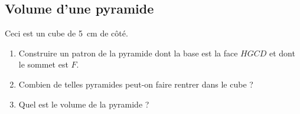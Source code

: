 
\subsection*{Volume d'une pyramide}

Ceci est un cube de \SI{5}{\centi\meter} de côté.
\begin{center}

\end{center}
\begin{enumerate}
    \item
        Construire un patron de la pyramide dont la base est la face \( HGCD\) et dont le sommet est \( F\).
    \item
        Combien de telles pyramides peut-on faire rentrer dans le cube ?
    \item
        Quel est le volume de la pyramide ?
\end{enumerate}
